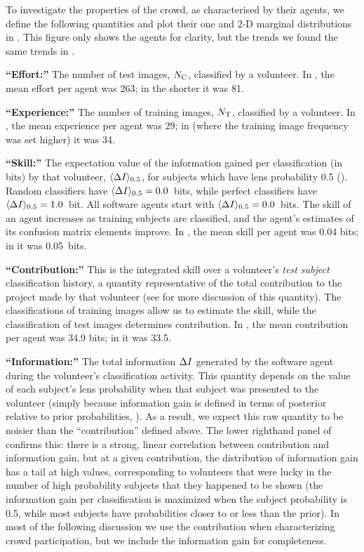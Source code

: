\documentclass[useAMS,usenatbib,a4paper]{mn2e}
\begin{document}
To investigate the properties of the \sw crowd, as characterised by their
agents, we define the following quantities and plot their one and 2-D marginal
distributions in
. This figure only shows the \StageOne agents for clarity,
but the trends we found the same trends in \StageTwo.
%
\begin{description}
%
\item{\noindent\bf ``Effort:''} The number of test images, $N_{\rm C}$, classified
by a volunteer. In \StageOne, the mean effort per agent was 263; in the shorter
\StageTwo it was 81.
%
\item{\noindent\bf ``Experience:''} The number of training images, $N_{\rm T}$,
classified by a volunteer. In \StageOne, the mean experience per agent was 29;
in \StageTwo (where the training image frequency was set higher) it was 34.
%
\item{\noindent\bf ``Skill:''} The expectation value of the information gained
per classification (in bits) by that volunteer,  ${\langle \Delta I \rangle_{0.5}}$, for subjects which
have lens probability 0.5 (). Random classifiers have
${\langle \Delta I \rangle_{0.5}} = 0.0$~bits, while perfect classifiers have ${\langle \Delta I \rangle_{0.5}} = 1.0$~bit.
All software agents start
with ${\langle \Delta I \rangle_{0.5}} = 0.0$~bits. The skill of  an agent increases as training subjects are
classified, and the agent's estimates of its confusion matrix elements improve.
In \StageOne, the mean skill per agent was 0.04 bits; in  \StageTwo it was
0.05~bits.
%
\item{\noindent\bf ``Contribution:''} This is the integrated skill over a volunteer's
{\it test subject} classification history, a quantity representative of the
total contribution to the project made by that volunteer (see  for
more discussion of this quantity). The classifications of training images
allow us to estimate the skill, while the classification of test images determines
contribution.  In \StageOne, the mean  contribution per agent was
34.9 bits; in \StageTwo it was 33.5.
%
\item{\noindent\bf ``Information:''} The total information $\Delta I$
generated by the software agent during the volunteer's classification activity. This
quantity depends on the value of each subject's lens probability when that
subject was presented to the volunteer (simply because information gain is
defined in terms of posterior relative to prior probabilities,
).  As a result, we expect this raw quantity to be noisier
than the ``contribution'' defined above. The lower righthand panel of
 confirms this: there is a strong, linear correlation
between contribution and information gain, but at a given contribution, the
distribution of information gain has a tail at high values, corresponding to
volunteers that were lucky in the number of high probability subjects that they
happened to be shown (the information gain per classification is maximized when the
subject probability is 0.5, while most subjects have probabilities closer to or less than the prior).
In most of the following discussion we use the contribution when characterizing
crowd participation, but we include
the information gain for completeness.
%
\end{description}
\end{document}
